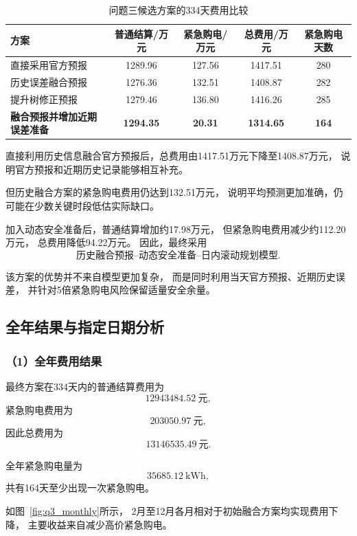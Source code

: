 \begin{table}[H]
\centering
\caption{问题三候选方案的334天费用比较}
\label{tab:q3_candidate}
\small
\setlength{\tabcolsep}{4pt}
\begin{tabular}{lcccc}
\hline
方案
& 普通结算/万元
& 紧急购电/万元
& 总费用/万元
& 紧急购电天数 \\
\hline
直接采用官方预报
& 1289.96 & 127.56 & 1417.51 & 280 \\

历史误差融合预报
& 1276.36 & 132.51 & 1408.87 & 282 \\

提升树修正预报
& 1279.46 & 136.80 & 1416.26 & 285 \\

\textbf{融合预报并增加近期误差准备}
& \textbf{1294.35}
& \textbf{20.31}
& \textbf{1314.65}
& \textbf{164} \\
\hline
\end{tabular}
\end{table}

直接利用历史信息融合官方预报后，总费用由1417.51万元下降至1408.87万元，
说明官方预报和近期历史记录能够相互补充。

但历史融合方案的紧急购电费用仍达到132.51万元，
说明平均预测更加准确，仍可能在少数关键时段低估实际缺口。

加入动态安全准备后，普通结算增加约17.98万元，
但紧急购电费用减少约112.20万元，
总费用降低94.22万元。
因此，最终采用
\[
\boxed{\text{历史融合预报--动态安全准备--日内滚动规划模型}}.
\]

该方案的优势并不来自模型更加复杂，
而是同时利用当天官方预报、近期历史误差，
并针对5倍紧急购电风险保留适量安全余量。


\subsection{全年结果与指定日期分析}

\subsubsection*{（1）全年费用结果}

最终方案在334天内的普通结算费用为
\[
12943484.52\ \text{元},
\]
紧急购电费用为
\[
203050.97\ \text{元},
\]
因此总费用为
\[
\boxed{13146535.49\ \text{元}}.
\]

全年紧急购电量为
\[
35685.12\ \mathrm{kWh},
\]
共有164天至少出现一次紧急购电。

如图~\ref{fig:q3_monthly}所示，
2月至12月各月相对于初始融合方案均实现费用下降，
主要收益来自减少高价紧急购电。


